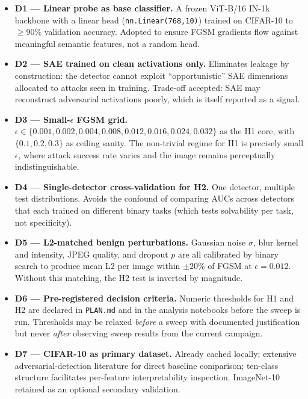 \documentclass[../ppgc-tese.tex]{subfiles}
\begin{document}
\begin{itemize}
    \item \textbf{D1 --- Linear probe as base classifier.} A frozen ViT-B/16 IN-1k backbone with a linear head (\texttt{nn.Linear(768,10)}) trained on CIFAR-10 to $\geq 90\%$ validation accuracy. Adopted to ensure FGSM gradients flow against meaningful semantic features, not a random head.
    \item \textbf{D2 --- SAE trained on clean activations only.} Eliminates leakage by construction: the detector cannot exploit ``opportunistic'' SAE dimensions allocated to attacks seen in training. Trade-off accepted: SAE may reconstruct adversarial activations poorly, which is itself reported as a signal.
    \item \textbf{D3 --- Small-$\epsilon$ FGSM grid.} $\epsilon \in \{0.001, 0.002, 0.004, 0.008, 0.012, 0.016, 0.024, 0.032\}$ as the H1 core, with $\{0.1, 0.2, 0.3\}$ as ceiling sanity. The non-trivial regime for H1 is precisely small $\epsilon$, where attack success rate varies and the image remains perceptually indistinguishable.
    \item \textbf{D4 --- Single-detector cross-validation for H2.} One detector, multiple test distributions. Avoids the confound of comparing AUCs across detectors that each trained on different binary tasks (which tests solvability per task, not specificity).
    \item \textbf{D5 --- L2-matched benign perturbations.} Gaussian noise $\sigma$, blur kernel and intensity, JPEG quality, and dropout $p$ are all calibrated by binary search to produce mean L2 per image within $\pm 20\%$ of FGSM at $\epsilon = 0.012$. Without this matching, the H2 test is inverted by magnitude.
    \item \textbf{D6 --- Pre-registered decision criteria.} Numeric thresholds for H1 and H2 are declared in \texttt{PLAN.md} and in the analysis notebooks before the sweep is run. Thresholds may be relaxed \emph{before} a sweep with documented justification but never \emph{after} observing sweep results from the current campaign.
    \item \textbf{D7 --- CIFAR-10 as primary dataset.} Already cached locally; extensive adversarial-detection literature for direct baseline comparison; ten-class structure facilitates per-feature interpretability inspection. ImageNet-10 retained as an optional secondary validation.
\end{itemize}
\end{document}
